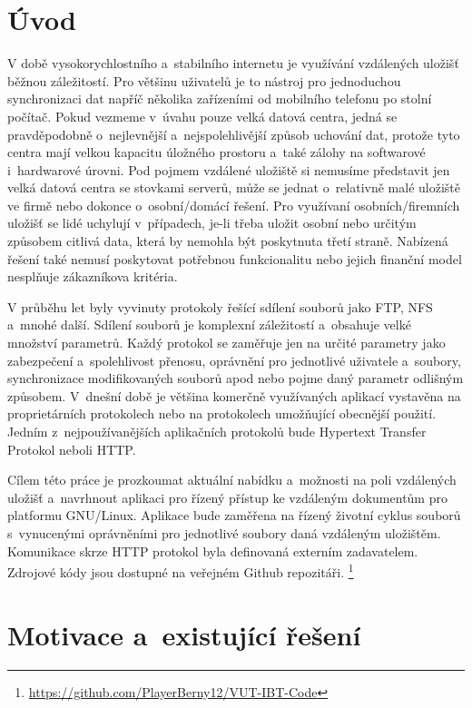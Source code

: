 \chapter{Úvod}

V době vysokorychlostního a stabilního internetu je využívání vzdálených uložišť běžnou záležitostí. Pro většinu uživatelů je to nástroj
pro jednoduchou synchronizaci dat napříč několika zařízeními od mobilního telefonu po stolní počítač. Pokud vezmeme v úvahu pouze velká datová centra,
jedná se pravděpodobně o nejlevnější a nejspolehlivější způsob uchování dat, protože tyto centra mají velkou kapacitu úložného prostoru a také zálohy na
softwarové i hardwarové úrovni. Pod pojmem vzdálené uložiště si nemusíme představit jen velká datová centra se stovkami serverů, může se jednat o relativně malé uložiště
ve firmě nebo dokonce o osobní/domácí řešení. Pro využívaní osobních/firemních uložišť se lidé uchylují v případech, je-li třeba uložit osobní nebo
určitým způsobem citlivá data, která by nemohla být poskytnuta třetí straně. Nabízená řešení také nemusí poskytovat potřebnou funkcionalitu nebo jejich finanční model
nesplňuje zákazníkova kritéria.

V průběhu let byly vyvinuty protokoly řešící sdílení souborů jako FTP, NFS a mnohé další. Sdílení souborů je komplexní záležitostí a obsahuje
velké množství parametrů. Každý protokol se zaměřuje jen na určité parametry jako zabezpečení a spolehlivost přenosu, oprávnění pro jednotlivé
uživatele a soubory, synchronizace modifikovaných souborů apod nebo pojme daný parametr odlišným způsobem. V dnešní době je většina komerčně využívaných
aplikací vystavěna na proprietárních protokolech nebo na protokolech umožňující obecnější použití. Jedním z nejpoužívanějších aplikačních protokolů
bude Hypertext Transfer Protokol neboli HTTP.

Cílem této práce je prozkoumat aktuální nabídku a možnosti na poli vzdálených uložišť a navrhnout aplikaci pro řízený přístup ke vzdáleným dokumentům pro
platformu \mbox{GNU/Linux}. Aplikace bude zaměřena na řízený životní cyklus souborů s vynucenými oprávněními pro jednotlivé soubory daná vzdáleným uložištěm.
Komunikace skrze HTTP protokol byla definovaná externím zadavatelem. Zdrojové kódy jsou dostupné na veřejném Github repozitáři.
\footnote{\url{https://github.com/PlayerBerny12/VUT-IBT-Code}}

\chapter{Motivace a existující řešení}

